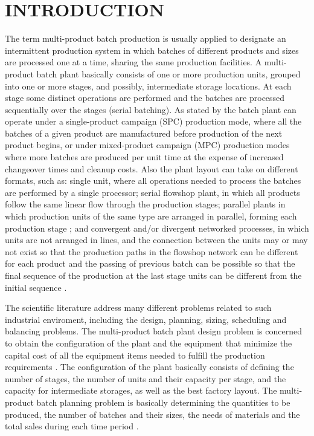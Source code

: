 \documentclass[10pt,fleqn,a4paper,twoside]{article}
\begin{document}
    \section{INTRODUCTION}
	\label{sec:intro}

The term multi-product batch production is usually applied to designate an intermittent production system in which batches of different products and sizes are processed one at a time, sharing the same production facilities. A multi-product batch plant basically consists of one or more production units, grouped into one or more stages, and possibly, intermediate storage locations. At each stage some distinct operations are performed and the batches are processed sequentially over the stages (serial batching). As stated by \cite{PetkovMaranas1998} the batch plant can operate under a single-product campaign (SPC) production mode, where all the batches of a given product are manufactured before production of the next product begins, or under mixed-product campaign (MPC) production modes where more batches are produced per unit time at the expense of increased changeover times and cleanup costs. Also the plant layout can take on different formats, such as: single unit, where all operations needed to process the batches are performed by a single processor; serial flowshop plant, in which all products follow the same linear flow through the production stages; parallel plants in which production units of the same type are arranged in parallel, forming each production stage \citep{ShiEtAll2017}; and convergent and/or divergent networked processes, in which units are not arranged in lines, and the connection between the units may or may not exist so that the production paths in the flowshop network can be different for each product and the passing of previous batch can be possible so that the final sequence of the production at the last stage units can be different from the initial sequence \citep{KimEtAl1996}.

The scientific literature address many different problems related to such industrial enviroment, including the design, planning, sizing, scheduling and balancing problems. The multi-product batch plant design problem is concerned to obtain the configuration of the plant and the equipment that minimize the capital cost of all the equipment items needed to fulfill the production requirements \citep{RavemarkAndRippin1998}. The configuration of the plant basically consists of defining the number of stages, the number of units and their capacity per stage, and the capacity for intermediate storages, as well as the best factory layout. The multi-product batch planning problem is basically determining the quantities to be produced, the number of batches and their sizes, the needs of materials and the total sales during each time period \citep{FumeroEtAl2016}.
\end{document}
